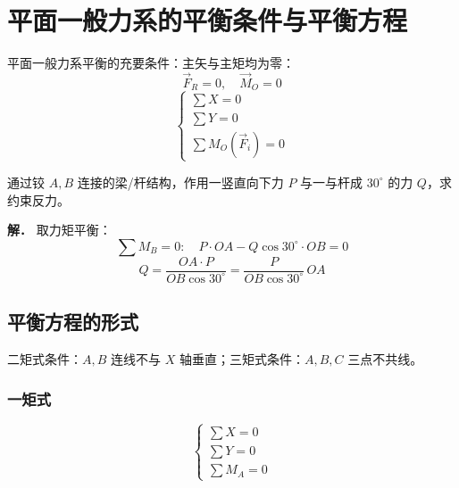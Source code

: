 \section{平面一般力系的平衡条件与平衡方程}

平面一般力系平衡的充要条件：主矢与主矩均为零：
\begin{equation}
\vec{F}_R=0,\quad \vec{M}_O=0
\label{eq:2-平衡-充要}
\end{equation}
\begin{equation}
\begin{cases}
\sum X=0\\ \sum Y=0\\ \sum M_O(\vec{F}_i)=0
\end{cases}
\label{eq:2-平衡-方程}
\end{equation}

\begin{example}
通过铰 $A,B$ 连接的梁/杆结构，作用一竖直向下力 $P$ 与一与杆成 $30^\circ$ 的力 $Q$，求约束反力。

\textbf{解．} 取力矩平衡：
\begin{equation}
\sum M_B=0:\quad P\cdot OA-Q\cos30^\circ\cdot OB=0
\label{eq:2-例-平衡-MB}
\end{equation}
\begin{equation}
Q=\frac{OA\cdot P}{OB\cos30^\circ}=\frac{P}{OB\cos30^\circ}\,OA
\label{eq:2-例-平衡-Q}
\end{equation}
\end{example}
\subsection{平衡方程的形式}

 二矩式条件：$A,B$ 连线不与 $X$ 轴垂直；三矩式条件：$A,B,C$ 三点不共线。

\subsubsection{一矩式}
\begin{equation}
\begin{cases}\sum X=0\\ \sum Y=0\\ \sum M_A=0\end{cases}
\label{eq:2-平衡-一矩}
\end{equation}

